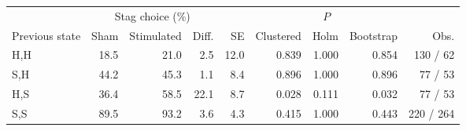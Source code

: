\small
\begin{tabular}{lrrrrrrrr}
\toprule
& \multicolumn{3}{c}{Stag choice (\%)} & & \multicolumn{3}{c}{$P$} & \\
\cmidrule(lr){2-4} \cmidrule(lr){6-8}
Previous state & Sham & Stimulated & Diff. & SE & Clustered & Holm & Bootstrap & Obs. \\
\midrule
H,H & 18.5 & 21.0 & 2.5 & 12.0 & 0.839 & 1.000 & 0.854 & 130 / 62 \\
S,H & 44.2 & 45.3 & 1.1 & 8.4 & 0.896 & 1.000 & 0.896 & 77 / 53 \\
H,S & 36.4 & 58.5 & 22.1 & 8.7 & 0.028 & 0.111 & 0.032 & 77 / 53 \\
S,S & 89.5 & 93.2 & 3.6 & 4.3 & 0.415 & 1.000 & 0.443 & 220 / 264 \\
\bottomrule
\end{tabular}
